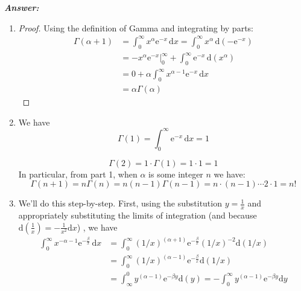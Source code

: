 \documentclass[12pt]{article}
\begin{document}
\textbf{\emph{Answer:} }

\begin{enumerate}
\item \begin{proof} Using the definition of Gamma and integrating by parts:
          \begin{align*}
		\Gamma(\alpha + 1) &= \int_0^\infty x^{\alpha}\mathrm{e}^{-x}\,\mathrm{d}x =
		\int_0^\infty x^{\alpha}\,\mathrm{d}(-\mathrm{e}^{-x})\\
		& = \left.-x^{\alpha}\mathrm{e}^{-x}\right|_0^\infty	+ \int_0^\infty \mathrm{e}^{-x}\,\mathrm{d}(x^{\alpha})\\
		& = 0 + \alpha\int_0^\infty x^{\alpha - 1}\mathrm{e}^{-x}\,\mathrm{d}x\\
		& = \alpha \Gamma(\alpha)
	  \end{align*}
          \end{proof}
\item We have $$
          \Gamma(1) = \int_0^\infty \mathrm{e}^{-x}\,\mathrm{d}x = 1
           $$
           
           $$
           \Gamma(2) = 1 \cdot \Gamma(1) = 1 \cdot 1 = 1
           $$
           In particular, from part 1, when $\alpha$ is some integer $n$  we have:
           $$
           \Gamma(n+1) = n \Gamma(n) = n (n -1) \Gamma(n - 1) =  n \cdot (n - 1) \cdots 2 \cdot 1 = n!
           $$

\item We'll do this step-by-step. First, using the substitution $y = \frac{1}{x}$ and appropriately substituting the limits of integration (and because $\mathrm{d}(\frac{1}{x}) = 
                                -\frac{1}{x^2}\mathrm{d}x$) , we have
                                \begin{align*}
                                \int_0^\infty x^{-\alpha - 1}\mathrm{e}^{-\frac{\beta}{x}}\,\mathrm{d}x &=
                                \int_0^\infty (1/x)^{(\alpha + 1)} \mathrm{e}^{-\frac{\beta}{x}} (1/x)^{-2}\mathrm{d}(1/x)\\
                                &= \int_0^\infty (1/x)^{(\alpha - 1)} \mathrm{e}^{-\frac{\beta}{x}} \mathrm{d}(1/x)\\
                                &= \int_\infty^0 y^{(\alpha - 1)} \mathrm{e}^{-\beta y} \mathrm{d}(y) = -\int_0^\infty y^{(\alpha - 1)} \mathrm{e}^{-\beta y} \mathrm{d}y
                                \end{align*}
                                

\end{enumerate}
\end{document}

